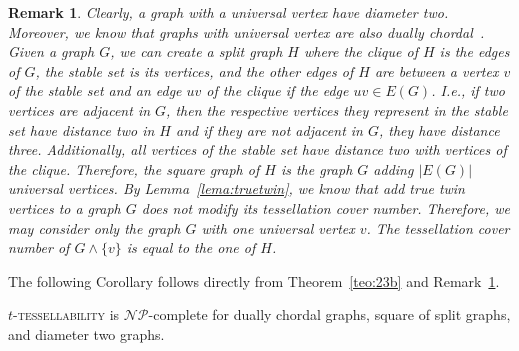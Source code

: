 \documentclass[9pt]{entcs} \usepackage{entcsmacro}
\newtheorem{rema}{Remark}[section]
\begin{document}
\begin{rema}
\label{rem:univ}
\emph{
Clearly, a graph with a universal vertex have diameter two.
Moreover, we know that graphs with universal vertex are also dually chordal~\cite{ArCitar}.
Given a graph $G$, we can create a split graph $H$ where the clique of $H$ is the edges of $G$, the stable set is its vertices, and the other edges of $H$ are between a vertex $v$ of the stable set and an edge $uv$ of the clique if the edge $uv \in E(G)$. 
I.e., if two vertices are adjacent in $G$, then the respective vertices they represent in the stable set have distance two in $H$ and if they are not adjacent in $G$, they have distance three. 
Additionally, all vertices of the stable set have distance two with vertices of the clique.
Therefore, the square graph of $H$ is the graph $G$ adding $|E(G)|$ universal vertices.
By Lemma~\ref{lema:truetwin}, we know that add true twin vertices to a graph $G$ does not modify its tessellation cover number.
Therefore, we may consider only the graph $G$ with one universal vertex $v$.
The tessellation cover number of $G \land \{v\}$ is equal to the one of $H$.
}
\end{rema}

The following Corollary follows directly from Theorem~\ref{teo:23b} and Remark~\ref{rem:univ}.

\begin{cor}
\textsc{$t$-tessellability} is $\mathcal{NP}$-complete for dually chordal graphs, square of split graphs, and diameter two graphs.
\end{cor}


\end{document}
